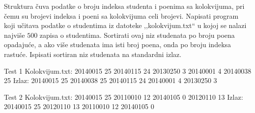 \begin{Exercise}[label=312]
Struktura  čuva podatke o broju
indeksa studenta i poenima sa kolokvijuma, pri čemu su
brojevi indeksa i poeni sa kolokvijuma celi brojevi. Napisati
program koji učitava podatke o studentima iz datoteke
,,kolokvijum.txt`` u kojoj se nalazi najviše $500$ zapisa
o studentima. Sortirati ovaj niz studenata po broju poena
opadajuće, a ako više studenata ima isti broj poena, onda po
broju indeksa rastuće. Ispisati sortiran niz studenata na
standardni izlaz.

\begin{miditest}
\begin{test}{Test 1}
Kolokvijum.txt:   20140015 25
                  20140115 24
                  20130250 3
                  20140001 4
                  20140038 25
Izlaz:            20140015 25
                  20140038 25
                  20140115 24
                  20140001 4
                  20130250 3
\end{test}
\end{miditest}

\begin{miditest}
\begin{test}{Test 2}
Kolokvijum.txt:   20140015 25
                  20110010 12
                  20140105 0
                  20120110 13
Izlaz:            20140015 25
                  20120110 13
                  20110010 12
                  20140105 0
\end{test}
\end{miditest}
\end{Exercise}
\begin{Answer}[ref=312]
\end{Answer}

